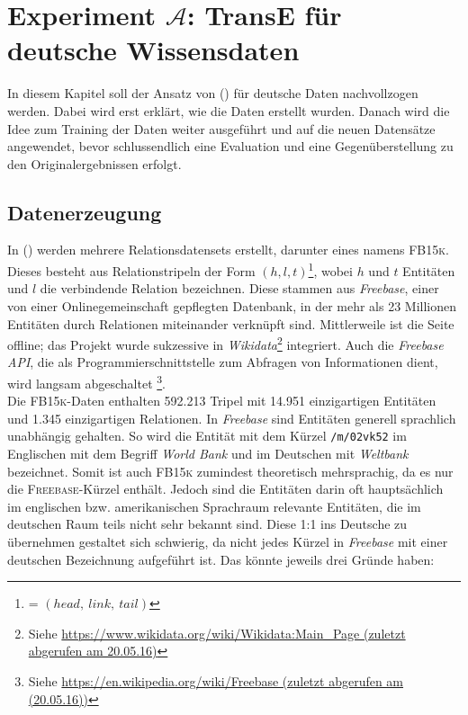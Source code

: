 
\chapter{Experiment $\mathcal{A}$: TransE für deutsche Wissensdaten} %

\label{Chapter6} %


In diesem Kapitel soll der Ansatz von (\cite{bordes2013translating}) für deutsche Daten nachvollzogen werden.
Dabei wird erst erklärt, wie die Daten erstellt wurden. Danach wird die Idee zum Training der Daten weiter ausgeführt und
auf die neuen Datensätze angewendet, bevor schlussendlich eine Evaluation und eine Gegenüberstellung zu den Originalergebnissen
erfolgt.

\section{Datenerzeugung}

In (\cite{bordes2013translating}) werden mehrere Relationsdatensets erstellt, darunter eines namens \textsc{FB15k}. Dieses
besteht aus Relationstripeln der Form $(h, l, t)$\footnote{= $(head,\ link,\ tail)$}, wobei
$h$ und $t$ Entitäten und $l$ die verbindende Relation bezeichnen. Diese stammen aus \emph{Freebase}, einer
von einer Onlinegemeinschaft gepflegten Datenbank, in der mehr als 23 Millionen Entitäten durch Relationen miteinander verknüpft sind.
Mittlerweile ist die Seite offline; das Projekt wurde sukzessive in \emph{Wikidata}\footnote{Siehe \url{https://www.wikidata.org/wiki/Wikidata:Main_Page (zuletzt abgerufen am 20.05.16)}} integriert. Auch die
\emph{Freebase API}, die als Programmierschnittstelle zum Abfragen von Informationen dient, wird langsam abgeschaltet
\footnote{Siehe \url{https://en.wikipedia.org/wiki/Freebase (zuletzt abgerufen am (20.05.16))}}.\\

Die \textsc{FB15k}-Daten enthalten 592.213 Tripel mit 14.951 einzigartigen Entitäten und 1.345 einzigartigen Relationen.
In \emph{Freebase} sind Entitäten generell sprachlich unabhängig gehalten. So wird die Entität mit dem Kürzel \verb|/m/02vk52|
im Englischen mit dem Begriff \emph{World Bank} und im Deutschen mit \emph{Weltbank} bezeichnet. Somit ist auch
\textsc{FB15k} zumindest theoretisch mehrsprachig, da es nur die \textsc{Freebase}-Kürzel enthält.
Jedoch sind die Entitäten darin oft hauptsächlich im englischen bzw. amerikanischen Sprachraum relevante
Entitäten, die im deutschen Raum teils nicht sehr bekannt sind. Diese 1:1 ins Deutsche zu übernehmen gestaltet sich schwierig,
da nicht jedes Kürzel in \emph{Freebase} mit einer deutschen Bezeichnung aufgeführt ist. Das könnte jeweils drei Gründe haben:

